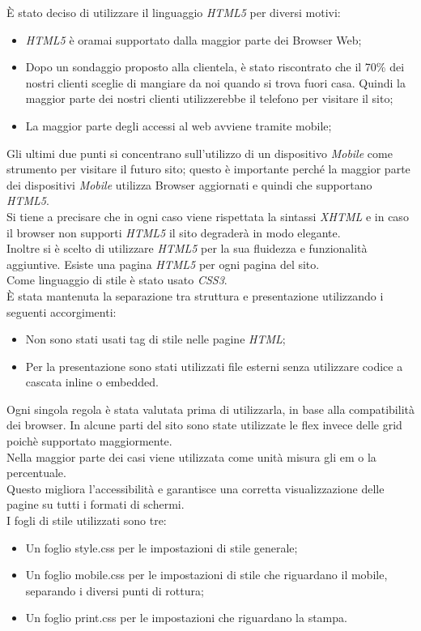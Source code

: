 È stato deciso di utilizzare il linguaggio \emph{HTML5} per diversi motivi:
\begin{itemize} %
	\item \emph{HTML5} è oramai supportato dalla maggior parte dei Browser Web;
	\item Dopo un sondaggio proposto alla clientela, è stato riscontrato che il 70\% dei nostri clienti sceglie di mangiare da noi quando si trova fuori casa. 
	Quindi la maggior parte dei nostri clienti utilizzerebbe il telefono per visitare il sito;
	\item La maggior parte degli accessi al web avviene tramite mobile;
\end{itemize}
Gli ultimi due punti si concentrano sull'utilizzo di un dispositivo \emph{Mobile} come strumento per visitare il futuro sito; questo è importante perché la maggior parte dei dispositivi \emph{Mobile} utilizza Browser aggiornati e quindi che supportano \emph{HTML5}.\\
Si tiene a precisare che in ogni caso viene rispettata la sintassi \emph{XHTML} e in caso il browser non supporti \emph{HTML5} il sito degraderà in modo elegante.\\
Inoltre si è scelto di utilizzare \emph{HTML5} per la sua fluidezza e funzionalità aggiuntive. %
Esiste una pagina \emph{HTML5} per ogni pagina del sito.\\ %
Come linguaggio di stile è stato usato \emph{CSS3}.\\
È stata mantenuta la separazione tra struttura e presentazione utilizzando i seguenti accorgimenti: 
\begin{itemize}
    \item Non sono stati usati tag di stile nelle pagine \emph{HTML};
    \item Per la presentazione sono stati utilizzati file esterni senza utilizzare codice a cascata inline o embedded.
\end{itemize}
Ogni singola regola è stata valutata prima di utilizzarla, in base alla compatibilità dei browser.
In alcune parti del sito sono state utilizzate le flex invece delle grid poichè supportato maggiormente.\\
Nella maggior parte dei casi viene utilizzata come unità misura gli em o la percentuale.\\
Questo migliora l'accessibilità e garantisce una corretta visualizzazione delle pagine su tutti i formati di schermi.\\
I fogli di stile utilizzati sono tre:
\begin{itemize}
	\item Un foglio style.css per le impostazioni di stile generale;
	\item Un foglio mobile.css per le impostazioni di stile che riguardano il mobile, separando i diversi punti di rottura; %
	\item Un foglio print.css per le impostazioni che riguardano la stampa.
\end{itemize}